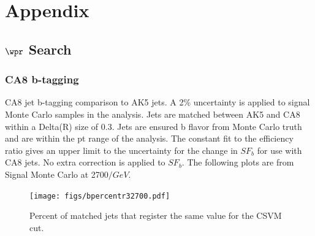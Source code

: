 \chapter{Appendix}
\label{sec:appendix}
\section{$\wpr$ Search}
\subsection{CA8 b-tagging}
\label{sec:ca8toak5}


CA8 jet b-tagging comparison to AK5 jets. A 2\% uncertainty is applied to signal Monte Carlo samples in the analysis.  Jets are matched between AK5 and CA8 
within a Delta(R) size of 0.3.
Jets are ensured b flavor from Monte Carlo truth and are within the pt range of the analysis.  The constant fit to the efficiency ratio gives an upper limit to the uncertainty 
for the change in $SF_b$ for use with CA8 jets.  No extra correction is applied to $SF_b$.  The following plots are from Signal Monte Carlo at 2700$/GeV$. 

\begin{figure}[Htcb]
\centering
\texttt{[image: figs/bpercentr32700.pdf]}
\caption{Percent of matched jets that register the same value for the CSVM cut.}
\label{figs:bpercent}
\end{figure}

